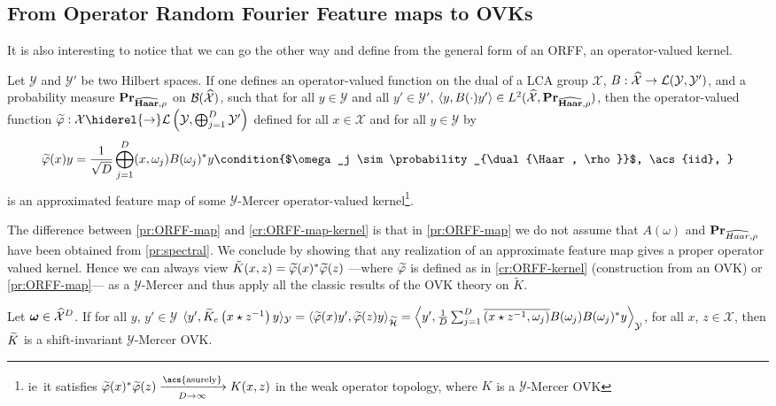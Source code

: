 \documentclass[twoside,11pt]{article}
\begin{document}
\subsection{From Operator Random Fourier Feature maps to OVKs}
It is also interesting to notice that we can go the other way and define from
the general form of an \acl{ORFF}, an operator-valued kernel.
\begin{proposition}
    \label{pr:ORFF-map} Let $\mathcal{Y}$ and $\mathcal{Y}'$ be two Hilbert
    spaces. If one defines an operator-valued function on the dual of a LCA
    group $\mathcal{X}$, $B: \widehat{\mathcal{X}} \to
    \mathcal{L}(\mathcal{Y},\mathcal{Y}')$, and a probability measure
    ${\mathbf{{Pr}}}_{\widehat{\mathbf{Haar}},\rho}$ on $\mathcal{B}(\widehat{\mathcal{X}})$,
    such that for all $y\in\mathcal{Y}$ and all $y'\in\mathcal{Y}'$, $\langle y,
    B(\cdot)y'\rangle \in L^2(\widehat{\mathcal{X}}, {\mathbf{{Pr}}}_{\widehat{\mathbf{Haar}},\rho})$,
    then the operator-valued function $\tildePhi{\omega}: \mathcal{X}
    \hiderel{\to} \mathcal{L}\left(\mathcal{Y},
    \vect_{j=1}^D\mathcal{Y}'\right)$ defined for all $x \in \mathcal{X}$ and
    for all $y\in\mathcal{Y}$ by
    \begin{dmath}
        \label{eq:phitilde}
        \tildePhi{\omega}(x)y
        = \frac{1}{\sqrt{D}}\Vect_{j=1}^D\pairing{x,
        \omega_j}B(\omega_j)^\adjoint y\condition{$\omega_j \sim
        \probability_{\dual{\Haar, \rho}}$, \acs{iid}, }
    \end{dmath}
    is an approximated feature map of some $\mathcal{Y}$-Mercer operator-valued
    kernel\footnote{\acs{ie}~it satisfies $\tildePhi{\omega}(x)^\adjoint
    \tildePhi{\omega}(z)\converges{\acs{asurely}}{D\to\infty}K(x,z)$ in the
    weak operator topology, where $K$ is a $\mathcal{Y}$-Mercer \acs{OVK}}.
\end{proposition}
The difference between \cref{pr:ORFF-map} and \cref{cr:ORFF-map-kernel} is that
in \cref{pr:ORFF-map} we do not assume that $A(\omega)$ and
${\mathbf{{Pr}}}_{\widehat{Haar}, \rho}$ have been obtained from \cref{pr:spectral}.
We conclude by showing that any realization of an approximate feature map gives
a proper operator valued kernel. Hence we can always view $\tilde{K}(x,
z)=\tildePhi{\omega}(x)^\adjoint \tildePhi{\omega}(z)$ ---where
$\tildePhi{\omega}$ is defined as in \cref{cr:ORFF-kernel} (construction from
an \acs{OVK}) or \cref{pr:ORFF-map}--- as a $\mathcal{Y}$-Mercer and thus apply
all the classic results of the \acl{OVK} theory on $\tilde{K}$.
\begin{proposition}
    \label{pr:orff_defines_kernel} Let $\boldsymbol{\mathbf{\omega}}\in\widehat{\mathcal{X}}^D$.
    If for all $y$, $y'\in\mathcal{Y}$ $\inner{y',
    \tildeK{\omega}_e\left(x\groupop z^{-1}\right)y}_{\mathcal{Y}}
    =\inner{\tildePhi{\omega}(x)y', \tildePhi{\omega}(z)y}_{\tildeH{\omega}}
    =\inner*{y', \frac{1}{D}\sum_{j=1}^D \conj{\pairing{x\groupop
    z^{-1},\omega_j}}B(\omega_j)B(\omega_j)^*y}_{\mathcal{Y}}$, for all $x$,
    $z\in\mathcal{X}$, then $\widetilde{K}$ is a shift-invariant
    $\mathcal{Y}$-Mercer \acl{OVK}.
\end{proposition}
\end{document}
